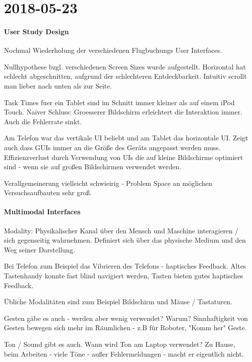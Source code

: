 \section{2018-05-23}

\paragraph{User Study Design}

Nochmal Wiederholung der verschiedenen Flugbuchungs User Interfaces.

Nullhypothese bzgl. verschiedenen Screen Sizes wurde aufgestellt. Horizontal hat schlecht
abgeschnitten, aufgrund der schlechteren Entdeckbarkeit. Intuitiv scrollt man lieber nach
unten als zur Seite. 

Task Times fuer ein Tablet sind im Schnitt immer kleiner als auf einem iPod Touch. Naiver
Schluss: Groesserer Bildschirm erleichtert die Interaktion immer. Auch die Fehlerrate
sinkt. 

Am Telefon war das vertikale UI beliebt und am Tablet das horizontale UI. Zeigt auch dass
GUIs immer an die Größe des Geräts angepasst werden muss. Effizienzverlust durch
Verwendung von UIs die auf kleine Bildschirme optimiert sind - wenn sie auf großen
Bildschirmen verwendet werden. 

Verallgemeinerung vielleicht schwieirig - Problem Space an möglichen Versuchsaufbauten
sehr groß.

\paragraph{Multimodal Interfaces}
Modality: Physikalischer Kanal über den Mensch und Maschine interagieren / sich
gegenseitig wahrnehmen. 
Definiert sich über das physische Medium und den Weg seiner Darstellung.

Bei Telefon zum Beispiel das Vibrieren des Telefons - haptisches Feedback. Altes
Tastenhandy konnte fast blind navigiert werden, Tasten bieten gutes haptisches Feedback. 

Übliche Modalitäten sind zum Beispiel Bildschirm und Mäuse / Tastaturen. 

Gesten gäbe es auch - werden aber wenig verwendet? Warum? Sinnhaftigkeit von Gesten
bewegen sich mehr im Räumlichen - z.B für Roboter, "Komm her" Geste. 

Ton / Sound gibt es auch. Wann wird Ton am Laptop verwendet? Zu Hause, beim Arbeiten -
viele Töne - außer Fehlermeldungen - macht er eigentlich nicht. 


